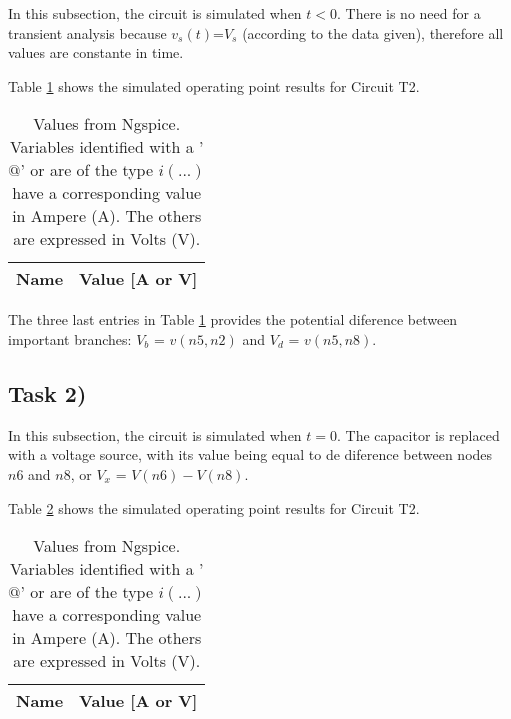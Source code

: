 In this subsection, the circuit is simulated when $t<0$. There is no need for a
transient analysis because $v_s(t)$=$V_s$ (according to the data given), therefore
all values are constante in time. 

Table \ref{tab:op1} shows the simulated operating point results for Circuit T2.

\begin{table}[ht]
	\centering
	\begin{tabular}{|l|r|}
		\hline    
		{\bf Name} & {\bf Value [A or V]} \\ \hline
    		
	\end{tabular}
	
	\caption{Values from Ngspice. Variables identified with a '$@$' or are of the type
	$i(...)$ have a corresponding value in Ampere (A). The others are expressed in Volts (V).}
    
\label{tab:op1}
\end{table}

The three last entries in Table \ref{tab:op1} provides the potential diference between important
branches: $V_b$ = $v(n5,n2)$ and $V_d$ = $v(n5,n8)$.



\subsection{Task 2)}
\label{subsec:task2}


In this subsection, the circuit is simulated when $t=0$. The capacitor is replaced with a voltage source, 
with its value being equal to de diference between nodes $n6$ and $n8$, or $V_x$ = $V(n6)-V(n8)$.

Table \ref{tab:op2} shows the simulated operating point results for Circuit T2.

\begin{table}[ht]
	\centering
	\begin{tabular}{|l|r|}
		\hline    
		{\bf Name} & {\bf Value [A or V]} \\ \hline
    		
	\end{tabular}
	
	\caption{Values from Ngspice. Variables identified with a '$@$' or are of the type
	$i(...)$ have a corresponding value in Ampere (A). The others are expressed in Volts (V).}
    
\label{tab:op2}
\end{table}

